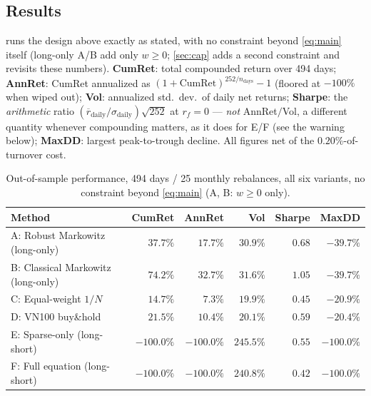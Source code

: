 \subsection{Results}\label{sec:results7}

 runs the design above exactly as stated, with no constraint beyond
\cref{eq:main} itself (long-only A/B add only $w\ge0$; \cref{sec:cap} adds a second constraint and
revisits these numbers). \textbf{CumRet}: total compounded return over 494 days; \textbf{AnnRet}:
CumRet annualized as $(1+\text{CumRet})^{252/n_{\text{days}}}-1$ (floored at $-100\%$ when wiped
out); \textbf{Vol}: annualized std.\ dev.\ of daily net returns; \textbf{Sharpe}: the
\emph{arithmetic} ratio $(\overline{r}_{\text{daily}}/\sigma_{\text{daily}})\sqrt{252}$ at
$r_f=0$ --- \emph{not} AnnRet$/$Vol, a different quantity whenever compounding matters, as it does
for E/F (see the warning below); \textbf{MaxDD}: largest peak-to-trough decline. All figures net
of the $0.20\%$-of-turnover cost.

\begin{table}[htbp]
\centering
\caption{Out-of-sample performance, 494 days / 25 monthly rebalances, all six variants, no
constraint beyond \cref{eq:main} (A, B: $w\ge0$ only).}
\label{tab:methods}
\small
\begin{tabular}{@{}lrrrrr@{}}
\toprule
\textbf{Method} & \textbf{CumRet} & \textbf{AnnRet} & \textbf{Vol} & \textbf{Sharpe} & \textbf{MaxDD} \\
\midrule
A: Robust Markowitz (long-only)     & $37.7\%$   & $17.7\%$   & $30.9\%$  & $0.68$ & $-39.7\%$ \\
B: Classical Markowitz (long-only)  & $\mathbf{74.2\%}$ & $\mathbf{32.7\%}$ & $31.6\%$ & $\mathbf{1.05}$ & $-39.7\%$ \\
C: Equal-weight $1/N$                       & $14.7\%$   & $7.3\%$    & $19.9\%$  & $0.45$ & $-20.9\%$ \\
D: VN100 buy\&hold                          & $21.5\%$   & $10.4\%$   & $20.1\%$  & $0.59$ & $\mathbf{-20.4\%}$ \\
E: Sparse-only (long-short)                 & $-100.0\%$ & $-100.0\%$ & $245.5\%$ & $0.55$ & $-100.0\%$ \\
F: Full equation (long-short)               & $-100.0\%$ & $-100.0\%$ & $240.8\%$ & $0.42$ & $-100.0\%$ \\
\bottomrule
\end{tabular}
\end{table}

